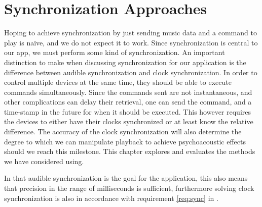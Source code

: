 \chapter{Synchronization Approaches}\label{cha:sync}

Hoping to achieve synchronization by just sending music data and a command to play is naïve, and we do not expect it to work.
Since synchronization is central to our app, we must perform some kind of synchronization.
An important distinction to make when discussing synchronization for our application is the difference between audible synchronization and clock synchronization.
In order to control multiple devices at the same time, they should be able to execute commands simultaneously.
Since the commands sent are not instantaneous, and other complications can delay their retrieval, one can send the command, and a time-stamp in the future for when it should be executed.
This however requires the devices to either have their clocks synchronized or at least know the relative difference.
The accuracy of the clock synchronization will also determine the degree to which we can manipulate playback to achieve psychoacoustic effects should we reach this milestone.
This chapter explores and evaluates the methods we have considered using.

In that audible synchronization is the goal for the application, this also means that precision in the range of milliseconds is sufficient, furthermore solving clock synchronization is also in accordance with requirement \ref{req:sync} in .

